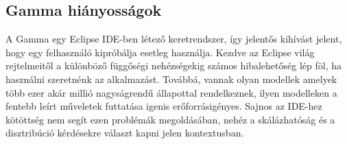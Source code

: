 \subsection{Gamma hiányosságok} \label{gamma_missing}

A Gamma egy Eclipse IDE-ben létező keretrendszer, így jelentős kihívást jelent, hogy egy felhasználó kipróbálja esetleg használja. Kezdve az Eclipse világ rejtelmeitől a különböző függőségi nehézségekig számos hibalehetőség lép föl, ha használni szeretnénk az alkalmazást. Továbbá, vannak olyan modellek amelyek több ezer akár millió nagyságrendű állapottal rendelkeznek, ilyen modelleken a fentebb leírt műveletek futtatása igenis erőforrásigényes. Sajnos az IDE-hez kötöttség nem segít ezen problémák megoldásában, nehéz a skálázhatóság és a disztribúció kérdésekre választ kapni jelen kontextusban.













